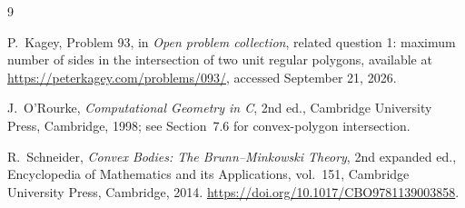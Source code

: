 \documentclass[11pt]{article}
\theoremstyle{remark}
\begin{document}
\begin{thebibliography}{9}

P.~Kagey,
\newblock Problem 93,
\newblock in \emph{Open problem collection}, related question 1: maximum number of sides in the intersection of two unit regular polygons,
\newblock available at \url{https://peterkagey.com/problems/093/}, accessed September 21, 2026.

J.~O'Rourke,
\newblock \emph{Computational Geometry in C},
\newblock 2nd ed., Cambridge University Press, Cambridge, 1998;
\newblock see Section~7.6 for convex-polygon intersection.

R.~Schneider,
\newblock \emph{Convex Bodies: The Brunn--Minkowski Theory},
\newblock 2nd expanded ed., Encyclopedia of Mathematics and its Applications, vol.~151,
Cambridge University Press, Cambridge, 2014.
\newblock \url{https://doi.org/10.1017/CBO9781139003858}.

\end{thebibliography}
\end{document}
